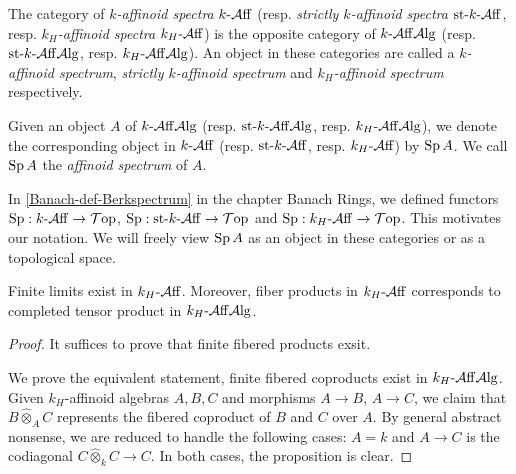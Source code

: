 \begin{definition}
    The category of \emph{$k$-affinoid spectra} $k\text{-}\mathcal{A}\mathrm{ff}$ (resp. \emph{strictly $k$-affinoid spectra} $\text{st-}k\text{-}\mathcal{A}\mathrm{ff}$, resp. \emph{$k_H$-affinoid spectra} $k_H\text{-}\mathcal{A}\mathrm{ff}$) is the opposite category of $k\text{-}\mathcal{A}\mathrm{ff}\mathcal{A}\mathrm{lg}$ (resp. $\text{st-}k\text{-}\mathcal{A}\mathrm{ff}\mathcal{A}\mathrm{lg}$, resp. $k_H\text{-}\mathcal{A}\mathrm{ff}\mathcal{A}\mathrm{lg}$). An object in these categories are called a \emph{$k$-affinoid spectrum}, \emph{strictly $k$-affinoid spectrum} and \emph{$k_H$-affinoid spectrum} respectively.

    Given an object $A$ of $k\text{-}\mathcal{A}\mathrm{ff}\mathcal{A}\mathrm{lg}$ (resp. $\text{st-}k\text{-}\mathcal{A}\mathrm{ff}\mathcal{A}\mathrm{lg}$, resp. $k_H\text{-}\mathcal{A}\mathrm{ff}\mathcal{A}\mathrm{lg}$), we denote the corresponding object in $k\text{-}\mathcal{A}\mathrm{ff}$ (resp. $\text{st-}k\text{-}\mathcal{A}\mathrm{ff}$, resp. $k_H\text{-}\mathcal{A}\mathrm{ff}$) by $\operatorname{Sp} A$. We call $\operatorname{Sp} A$ the \emph{affinoid spectrum} of $A$.
\end{definition}
In \cref{Banach-def-Berkspectrum} in the chapter Banach Rings, we defined functors $\operatorname{Sp}:k\text{-}\mathcal{A}\mathrm{ff}\rightarrow \mathcal{T}\mathrm{op}$, $\operatorname{Sp}:\text{st-}k\text{-}\mathcal{A}\mathrm{ff}\rightarrow \mathcal{T}\mathrm{op}$ and $\operatorname{Sp}:k_H\text{-}\mathcal{A}\mathrm{ff}\rightarrow \mathcal{T}\mathrm{op}$. This motivates our notation. We will freely view $\operatorname{Sp} A$ as an object in these categories or as a topological space.

\begin{proposition}\label{prop-existfiberprod}
    Finite limits exist in $k_H\text{-}\mathcal{A}\mathrm{ff}$. Moreover, fiber products in $k_H\text{-}\mathcal{A}\mathrm{ff}$ corresponds to completed tensor product in $k_H\text{-}\mathcal{A}\mathrm{ff}\mathcal{A}\mathrm{lg}$.
\end{proposition}
\begin{proof}
    It suffices to prove that finite fibered products exsit.

    We prove the equivalent statement, finite fibered coproducts exist in $k_H\text{-}\mathcal{A}\mathrm{ff}\mathcal{A}\mathrm{lg}$. Given $k_H$-affinoid algebras $A,B,C$ and morphisms $A\rightarrow B$, $A\rightarrow C$, we claim that $B\hat{\otimes}_A C$ represents the fibered coproduct of $B$ and $C$ over $A$. 
    By general abstract nonsense, we are reduced to handle the following cases: $A=k$ and $A\rightarrow C$ is the codiagonal $C\hat{\otimes}_k C\rightarrow C$. In both cases, the proposition is clear.


\end{proof}




